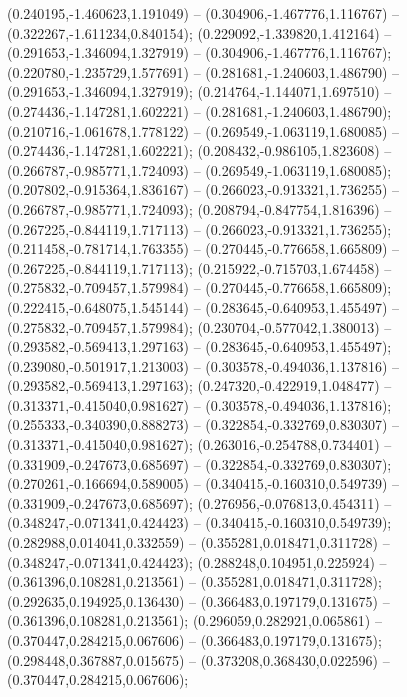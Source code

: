  (0.240195,-1.460623,1.191049) -- (0.304906,-1.467776,1.116767) -- (0.322267,-1.611234,0.840154);
 (0.229092,-1.339820,1.412164) -- (0.291653,-1.346094,1.327919) -- (0.304906,-1.467776,1.116767);
 (0.220780,-1.235729,1.577691) -- (0.281681,-1.240603,1.486790) -- (0.291653,-1.346094,1.327919);
 (0.214764,-1.144071,1.697510) -- (0.274436,-1.147281,1.602221) -- (0.281681,-1.240603,1.486790);
 (0.210716,-1.061678,1.778122) -- (0.269549,-1.063119,1.680085) -- (0.274436,-1.147281,1.602221);
 (0.208432,-0.986105,1.823608) -- (0.266787,-0.985771,1.724093) -- (0.269549,-1.063119,1.680085);
 (0.207802,-0.915364,1.836167) -- (0.266023,-0.913321,1.736255) -- (0.266787,-0.985771,1.724093);
 (0.208794,-0.847754,1.816396) -- (0.267225,-0.844119,1.717113) -- (0.266023,-0.913321,1.736255);
 (0.211458,-0.781714,1.763355) -- (0.270445,-0.776658,1.665809) -- (0.267225,-0.844119,1.717113);
 (0.215922,-0.715703,1.674458) -- (0.275832,-0.709457,1.579984) -- (0.270445,-0.776658,1.665809);
 (0.222415,-0.648075,1.545144) -- (0.283645,-0.640953,1.455497) -- (0.275832,-0.709457,1.579984);
 (0.230704,-0.577042,1.380013) -- (0.293582,-0.569413,1.297163) -- (0.283645,-0.640953,1.455497);
 (0.239080,-0.501917,1.213003) -- (0.303578,-0.494036,1.137816) -- (0.293582,-0.569413,1.297163);
 (0.247320,-0.422919,1.048477) -- (0.313371,-0.415040,0.981627) -- (0.303578,-0.494036,1.137816);
 (0.255333,-0.340390,0.888273) -- (0.322854,-0.332769,0.830307) -- (0.313371,-0.415040,0.981627);
 (0.263016,-0.254788,0.734401) -- (0.331909,-0.247673,0.685697) -- (0.322854,-0.332769,0.830307);
 (0.270261,-0.166694,0.589005) -- (0.340415,-0.160310,0.549739) -- (0.331909,-0.247673,0.685697);
 (0.276956,-0.076813,0.454311) -- (0.348247,-0.071341,0.424423) -- (0.340415,-0.160310,0.549739);
 (0.282988,0.014041,0.332559) -- (0.355281,0.018471,0.311728) -- (0.348247,-0.071341,0.424423);
 (0.288248,0.104951,0.225924) -- (0.361396,0.108281,0.213561) -- (0.355281,0.018471,0.311728);
 (0.292635,0.194925,0.136430) -- (0.366483,0.197179,0.131675) -- (0.361396,0.108281,0.213561);
 (0.296059,0.282921,0.065861) -- (0.370447,0.284215,0.067606) -- (0.366483,0.197179,0.131675);
 (0.298448,0.367887,0.015675) -- (0.373208,0.368430,0.022596) -- (0.370447,0.284215,0.067606);
